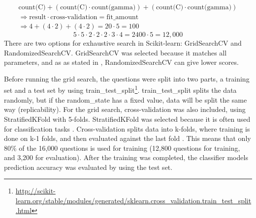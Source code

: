 \begin{equation}\label{eq:fit_svc}
\begin{split}
\text{count(C)} + (\text{count(C)} \cdot \text{count(gamma)}) + (\text{count(C)} \cdot \text{count(gamma)}) \\
\Longrightarrow  \text{result} \cdot \text{cross-validation} = \text{fit\_amount} \\
\Longrightarrow  4 + (4 \cdot 2) + (4 \cdot 2) = 20 \cdot 5 = 100 
\end{split}
\end{equation}
\begin{equation}\label{eq:fit_sgd}
 5 \cdot 5 \cdot 2 \cdot 2 \cdot 2 \cdot 3 \cdot 4 = 2400 \cdot 5 = 12,000
\end{equation}
There are two options for exhaustive search in Scikit-learn: GridSearchCV and RandomizedSearchCV.
GridSearchCV was selected because it matches all parameters, and as as stated in \cite{Markham2015a}, RandomizedSearchCV can give lower scores.
\begin{comment}
From Scikit-learn, there are two options for exhaustive search: GridSearchCV and RandomizedSearchCV.
The main difference is that GridSearchCV matches all parameters, and RandomizedSearchCV only uses a selection of the parameters. 
RandomizedSearchCV is faster than GridSearchCV, but as stated in \cite{Markham2015a}, it may give lower scores.
\textcite{Markham2015a} also suggests to start GridSearchCV and then compare the results against RandomizedSearchCV.
Since I wanted to find the best parameters from the selection, GridSearchCV was used. 
However, if the goal was to fine-tune the parameters, RandomizedSearchCV could be more fitting. 
E.g. start with a high spread of values, and after each completed training, select a new set of values based on the best results. 
If the score was then too low, or if you wanted better results, you could use GridSearchCV to find the best parameters.
\end{comment} 
\vspace{0.5em}\newline
Before running the grid search, the questions were split into two parts, a training set and a test set by using 
 train\_test\_split\footnote{\url{http://scikit-learn.org/stable/modules/generated/sklearn.cross_validation.train_test_split.html}}.
train\_test\_split splits the data randomly, but if the random\_state has a fixed value, data will be split the same way (replicability).
For the grid search, cross-validation was also included, using StratifiedKFold with 5-folds.
StratifiedKFold was selected because it is often used for classification tasks \cite{Kononenko2007}.
Cross-validation splits data into k-folds, where training is done on k-1 folds, and then evaluated against the last fold \cite{Bishop2006}.
This means that only 80\% of the 16,000 questions is used for training (12,800 questions for training, and 3,200 for evaluation).
After the training was completed, the classifier models prediction accuracy was evaluated by using the test set.

